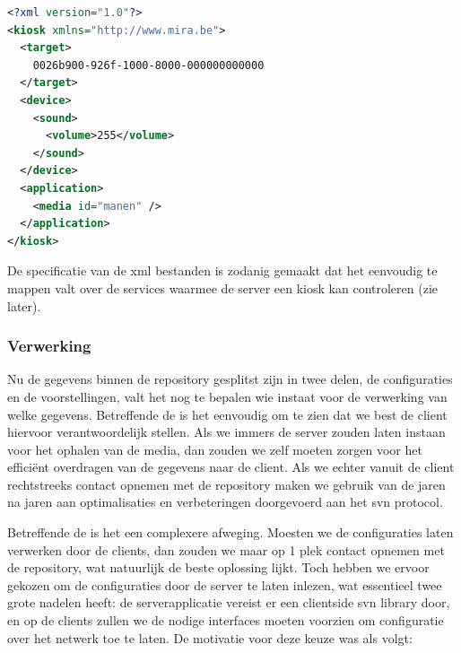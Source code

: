 \begin{lstlisting}[language=XML, float, caption=Voorbeeld van een kiosk configuratiebstand., label=lst:config]
<?xml version="1.0"?>
<kiosk xmlns="http://www.mira.be">
  <target>
    0026b900-926f-1000-8000-000000000000
  </target>
  <device>
    <sound>
      <volume>255</volume>
    </sound>
  </device>
  <application>
    <media id="manen" />
  </application>
</kiosk>
\end{lstlisting}

De specificatie van de \ac{xml} bestanden is zodanig gemaakt dat het eenvoudig te mappen valt over de services waarmee de server een kiosk kan controleren (zie later).

\subsubsection{Verwerking}

Nu de gegevens binnen de repository gesplitst zijn in twee delen, de configuraties en de voorstellingen, valt het nog te bepalen wie instaat voor de verwerking van welke gegevens. Betreffende de  is het eenvoudig om te zien dat we best de client hiervoor verantwoordelijk stellen. Als we immers de server zouden laten instaan voor het ophalen van de media, dan zouden we zelf moeten zorgen voor het efficiënt overdragen van de gegevens naar de client. Als we echter vanuit de client rechtstreeks contact opnemen met de repository maken we gebruik van de jaren na jaren aan optimalisaties en verbeteringen doorgevoerd aan het \ac{svn} protocol.

Betreffende de  is het een complexere afweging. Moesten we de configuraties laten verwerken door de clients, dan zouden we maar op 1 plek contact opnemen met de repository, wat natuurlijk de beste oplossing lijkt. Toch hebben we ervoor gekozen om de configuraties door de server te laten inlezen, wat essentieel twee grote nadelen heeft: de serverapplicatie vereist er een clientside \ac{svn} library door, en op de clients zullen we de nodige interfaces moeten voorzien om configuratie over het netwerk toe te laten. De motivatie voor deze keuze was als volgt:

